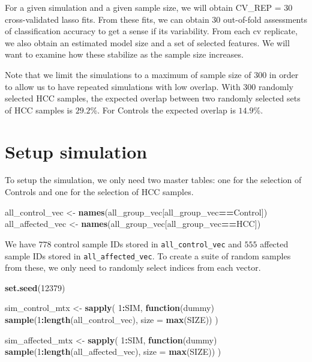 \documentclass[
]{book}
\newenvironment{Shaded}{\begin{snugshade}}{\end{snugshade}}
\newcommand{\ControlFlowTok}[1]{\textcolor[rgb]{0.13,0.29,0.53}{\textbf{#1}}}
\newcommand{\DataTypeTok}[1]{\textcolor[rgb]{0.13,0.29,0.53}{#1}}
\newcommand{\DecValTok}[1]{\textcolor[rgb]{0.00,0.00,0.81}{#1}}
\newcommand{\KeywordTok}[1]{\textcolor[rgb]{0.13,0.29,0.53}{\textbf{#1}}}
\newcommand{\NormalTok}[1]{#1}
\newcommand{\OperatorTok}[1]{\textcolor[rgb]{0.81,0.36,0.00}{\textbf{#1}}}
\newcommand{\StringTok}[1]{\textcolor[rgb]{0.31,0.60,0.02}{#1}}
\begin{document}
For a given simulation and a given sample size, we will obtain
CV\_REP = \(30\) cross-validated lasso fits. From these fits,
we can obtain \(30\) out-of-fold assessments of classification accuracy
to get a sense if its variability. From each cv replicate, we also obtain
an estimated model size and a set of selected features. We will want
to examine how these stabilize as the sample size increases.

Note that we limit the simulations to a maximum of sample size of 300 in
order to allow us to have repeated simulations with low overlap. With 300
randomly selected HCC samples, the expected overlap between two randomly
selected sets of HCC samples is \(29.2\)\%.
For Controls the expected overlap is \(14.9\)\%.

\hypertarget{setup-simulation}{%
\section{Setup simulation}\label{setup-simulation}}

To setup the simulation, we only need two master tables: one for the selection of Controls
and one for the selection of HCC samples.

\begin{Shaded}
\begin{Highlighting}[]
\NormalTok{all\_control\_vec <{-}}\StringTok{ }\KeywordTok{names}\NormalTok{(all\_group\_vec[all\_group\_vec}\OperatorTok{==}\StringTok{\textquotesingle{}Control\textquotesingle{}}\NormalTok{]) }
\NormalTok{all\_affected\_vec <{-}}\StringTok{ }\KeywordTok{names}\NormalTok{(all\_group\_vec[all\_group\_vec}\OperatorTok{==}\StringTok{\textquotesingle{}HCC\textquotesingle{}}\NormalTok{])  }
\end{Highlighting}
\end{Shaded}

We have \(778\) control sample IDs stored in \texttt{all\_control\_vec}
and \(555\) affected sample IDs stored in \texttt{all\_affected\_vec}.
To create a suite of random samples from these, we only need to randomly select indices from
each vector.

\begin{Shaded}
\begin{Highlighting}[]
\KeywordTok{set.seed}\NormalTok{(}\DecValTok{12379}\NormalTok{)}

\NormalTok{sim\_control\_mtx <{-}}\StringTok{ }\KeywordTok{sapply}\NormalTok{(}
 \DecValTok{1}\OperatorTok{:}\NormalTok{SIM, }
 \ControlFlowTok{function}\NormalTok{(dummy) }
   \KeywordTok{sample}\NormalTok{(}\DecValTok{1}\OperatorTok{:}\KeywordTok{length}\NormalTok{(all\_control\_vec), }\DataTypeTok{size =}  \KeywordTok{max}\NormalTok{(SIZE))}
\NormalTok{)}


\NormalTok{sim\_affected\_mtx <{-}}\StringTok{ }\KeywordTok{sapply}\NormalTok{(}
 \DecValTok{1}\OperatorTok{:}\NormalTok{SIM, }
 \ControlFlowTok{function}\NormalTok{(dummy) }
   \KeywordTok{sample}\NormalTok{(}\DecValTok{1}\OperatorTok{:}\KeywordTok{length}\NormalTok{(all\_affected\_vec), }\DataTypeTok{size =}  \KeywordTok{max}\NormalTok{(SIZE))}
\NormalTok{)}
\end{Highlighting}
\end{Shaded}
\end{document}
